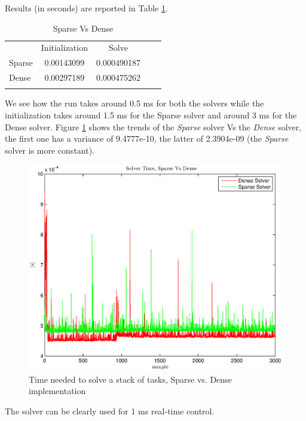 Results (in seconds) are reported in Table \ref{sparse_vs_dense}.
\begin{table}[!hb]
\centering
\caption{Sparse Vs Dense}
\label{sparse_vs_dense}
\begin{tabular}{lccll}
\cline{2-3}
\multicolumn{1}{l|}{}  & \multicolumn{1}{c|}{Initialization} & \multicolumn{1}{c|}{Solve} &  &  \\ \cline{1-3}
\multicolumn{1}{|l|}{Sparse} & \multicolumn{1}{c|}{0.00143099} & \multicolumn{1}{c|}{0.000490187} &  &  \\ \cline{1-3}
\multicolumn{1}{|l|}{Dense} & \multicolumn{1}{c|}{0.00297189} & \multicolumn{1}{c|}{0.000475262} &  &  \\ \cline{1-3}
                       & \multicolumn{1}{l}{}  & \multicolumn{1}{l}{}  &  & 
\end{tabular}
\end{table}
We see how the run takes around 0.5 ms for both the solvers while the initialization takes around 1.5 ms for the Sparse solver and around 3 ms for the Dense solver. Figure \ref{solver_time} shows the trends of the \emph{Sparse} solver Vs the \emph{Dense} solver, the first one has a variance of 9.4777e-10, the latter of 2.3904e-09 (the \emph{Sparse} solver is more constant).
\begin{figure}[htb!]
\vspace{2 mm}
\centering 
\includegraphics[width=0.6\linewidth]{images/wholebody/solverTime3.eps} 
\caption{Time needed to solve a stack of tasks, Sparse vs. Dense implementation} 
\label{solver_time}
\end{figure}
The solver can be clearly used for 1 ms real-time control. %

